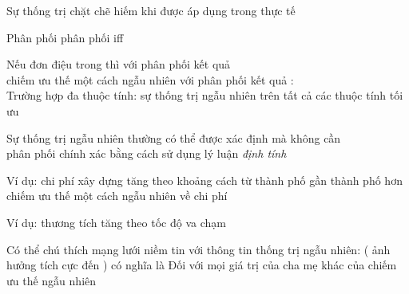 \documentclass{article}
\begin{document}
\begin{huge}
\vspace*{0.2in}

\textwidth
{}

Sự thống trị chặt chẽ hiếm khi được áp dụng trong thực tế




Phân phối   phân phối  iff\nl

Nếu  đơn điệu trong  thì  với phân phối kết quả \\
chiếm ưu thế một cách ngẫu nhiên  với phân phối kết quả :\nl
  \\
Trường hợp đa thuộc tính: sự thống trị ngẫu nhiên trên tất cả các thuộc tính \mat{$\implies$} tối ưu




Sự thống trị ngẫu nhiên thường có thể được xác định mà không cần \\
phân phối chính xác bằng cách sử dụng lý luận \emph{định tính}

Ví dụ: chi phí xây dựng tăng theo khoảng cách từ thành phố\nl
       gần thành phố hơn \al
  \mat{$\implies$}  chiếm ưu thế một cách ngẫu nhiên  về chi phí

Ví dụ: thương tích tăng theo tốc độ va chạm

Có thể chú thích mạng lưới niềm tin với thông tin thống trị ngẫu nhiên:\al
   ( ảnh hưởng tích cực đến ) có nghĩa là \al
  Đối với mọi giá trị  của cha mẹ khác của   \nl
     chiếm ưu thế ngẫu nhiên 



\vspace*{0.1in}


\end{huge}
\end{document}
